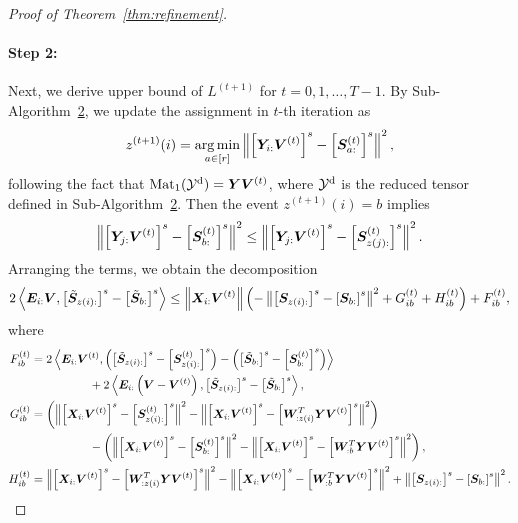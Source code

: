 \documentclass[lettersize,onecolumn,journal]{IEEEtran}
\theoremstyle{definition}
\theoremstyle{definition}
\newcommand{\of}[1]{\left(#1\right)}
\newcommand{\off}[1]{\left[#1\right]}
\newcommand{\ang}[1]{\left\langle#1\right\rangle}
\begin{document}
\begin{proof}[Proof of Theorem~\ref{thm:refinement}]
\paragraph{Step 2:} Next, we derive upper bound of $L^{(t+1)}$ for $t = 0 ,1, \ldots, T-1$. By Sub-Algorithm~\hyperref[alg:main]{2}, we update the assignment in $t$-th iteration as 
    \begin{equation}
        z^{(t+1)}(i) = \argmin_{a \in [r]} \onorm{ \off{ \mY_{i:} \mV^{(t)}  }^s - \off{\mS_{a:}^{(t)}}^s }^2,
    \end{equation}
    following the fact that $\text{Mat}_1(\mathcal{Y}^\text{d}) = \bm Y \bm{V}^{(t)}$, where $\mathcal{Y}^\text{d}$ is the reduced tensor defined in Sub-Algorithm~\hyperref[alg:main]{2}. Then the event $z^{(t+1)}(i) = b$ implies
    \begin{equation}
        \onorm{ \off{ \mY_{j:} \mV^{(t)}  }^s - \off{\mS_{b:}^{(t)}}^s }^2 \leq \onorm{ \off{ \mY_{j:} \mV^{(t)}  }^s - \off{\mS_{z(j):}^{(t)}}^s }^2.
    \end{equation}
    Arranging the terms, we obtain the decomposition
    \begin{equation}\label{eq:decomp}
        2 \ang{ \mE_{i:} \mV, \off{  \tilde \mS_{z(i):} }^s - \off{  \tilde \mS_{b:} }^s } \leq \onorm{\mX_{i:} \mV^{(t)}} \of{ - \onorm{ \off{ \mS_{z(i):}  }^s - \off{ \mS_{b:}  }^s  }^2 + G_{ib}^{(t)} + H_{ib}^{(t)} } +  F_{ib}^{(t)},
    \end{equation}
    where
    \begin{align}
        F_{ib}^{(t)} &= 2 \ang{\mE_{i:} \mV^{(t)}, \of{ \off{  \tilde \mS_{z(i):} }^s  -  \off{  \mS_{z(i):}^{(t)} }^s  }  - \of{  \off{  \tilde \mS_{b:} }^s  -  \off{  \mS_{b:}^{(t)} }^s  }  } \\
        & \quad \quad \quad \quad \quad + 2 \ang{ \mE_{i:} \of{ \mV - \mV^{(t)} }, \off{  \tilde \mS_{z(i):} }^s - \off{  \tilde \mS_{b:} }^s  },\\
        G_{ib}^{(t)} &=   \of{ \onorm{ \off{\mX_{i:} \mV^{(t)}}^s -  \off{  \mS_{z(i):}^{(t)}  }^s}^2 -  \onorm{ \off{\mX_{i:} \mV^{(t)}}^s -  \off{  \mW_{:z(i)}^T \mY \mV^{(t)} }^s}^2}   \\
        & \quad \quad \quad \quad \quad -   \of{ \onorm{ \off{\mX_{i:} \mV^{(t)}}^s -  \off{  \mS_{b:}^{(t)}  }^s}^2 -  \onorm{ \off{\mX_{i:} \mV^{(t)}}^s -  \off{  \mW_{:b}^T \mY \mV^{(t)} }^s}^2 }, \\
        H_{ib}^{(t)} &=   \onorm{ \off{\mX_{i:} \mV^{(t)}}^s -  \off{  \mW_{:z(i)}^T \mY \mV^{(t)} }^s}^2 - \onorm{ \off{\mX_{i:} \mV^{(t)}}^s -  \off{  \mW_{:b}^T \mY \mV^{(t)} }^s}^2  + \onorm{ \off{ \mS_{z(i):}  }^s - \off{ \mS_{b:}  }^s  }^2 .
    \end{align}
    

\end{proof}
\end{document}
